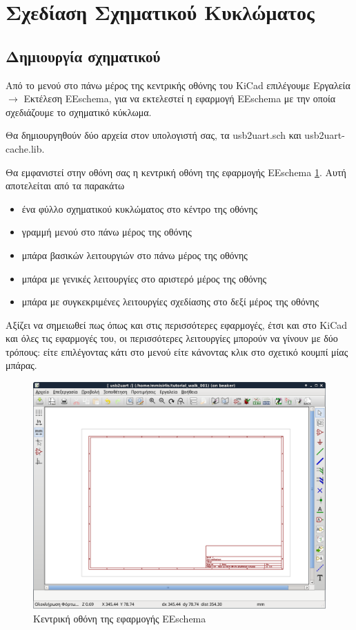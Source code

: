 \documentclass[a4paper]{article}
\begin{document}
\section{Σχεδίαση Σχηματικού Κυκλώματος}

\subsection{Δημιουργία σχηματικού}
Από το μενού στο πάνω μέρος της κεντρικής οθόνης του \textenglish{KiCad} επιλέγουμε Εργαλεία $\rightarrow$ Εκτέλεση \textenglish{EEschema}, για να εκτελεστεί η εφαρμογή \textenglish{EEschema} με την οποία σχεδιάζουμε το σχηματικό κύκλωμα. 

Θα δημιουργηθούν δύο αρχεία στον υπολογιστή σας, τα usb2uart.sch και usb2uart-cache.lib. 

Θα εμφανιστεί στην οθόνη σας η κεντρική οθόνη της εφαρμογής \textenglish{EEschema} \ref{fig:eesch-main-window}. Αυτή αποτελείται από τα παρακάτω
\begin{itemize}
    \item ένα φύλλο σχηματικού κυκλώματος στο κέντρο της οθόνης
    \item γραμμή μενού στο πάνω μέρος της οθόνης
    \item μπάρα βασικών λειτουργιών στο πάνω μέρος της οθόνης
    \item μπάρα με γενικές λειτουργίες στο αριστερό μέρος της οθόνης
    \item μπάρα με συγκεκριμένες λειτουργίες σχεδίασης στο δεξί μέρος της οθόνης
\end{itemize}
Αξίζει να σημειωθεί πως όπως και στις περισσότερες εφαρμογές, έτσι και στο \textenglish{KiCad} και όλες τις εφαρμογές του, οι περισσότερες λειτουργίες μπορούν να γίνουν με δύο τρόπους: είτε επιλέγοντας κάτι στο μενού είτε κάνοντας κλικ στο σχετικό κουμπί μίας μπάρας.

\begin{figure}
  \begin{center}
    \includegraphics[width=.9\textwidth]{img/eesch-main-window.png}
    \caption{Κεντρική οθόνη της εφαρμογής \textenglish{EEschema}}
    \label{fig:eesch-main-window}
  \end{center}
\end{figure}
\end{document}
